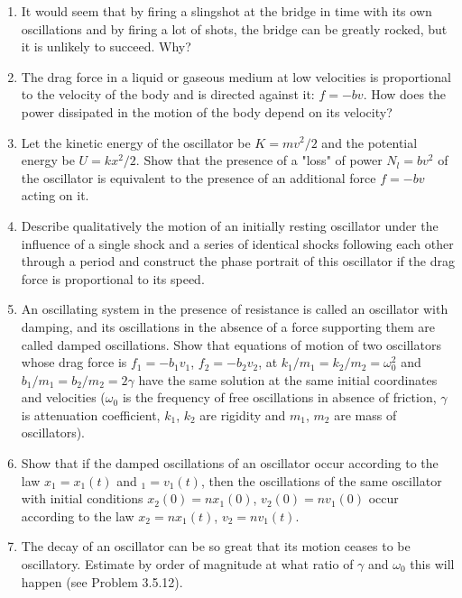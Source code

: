 \documentclass{article}
\begin{document}
\begin{enumerate}[label=3.5.\arabic*]
\item It would seem that by firing a slingshot at the bridge in time with its own oscillations and by firing a lot of shots, the bridge can be greatly rocked, but it is unlikely to succeed. Why?

\item The drag force in a liquid or gaseous medium at low velocities is proportional to the velocity of the body and is directed against it: $f = -b v$. How does the power dissipated in the motion of the body depend on its velocity?

\item Let the kinetic energy of the oscillator be $K = m v^2/2$ and the potential energy be $U = k x^2/2$. Show that the presence of a "loss" of power $N_l = b v^2$ of the oscillator is equivalent to the presence of an additional force $f = -b v$ acting on it.

\item Describe qualitatively the motion of an initially resting oscillator under the influence of a single shock and a series of identical shocks following each other through a period and construct the phase portrait of this oscillator if the drag force is proportional to its speed.

\item An oscillating system in the presence of resistance is called an oscillator with damping, and its oscillations in the absence of a force supporting them are called damped oscillations. Show that equations of motion of two oscillators whose drag force is $f_1 = -b_1 v_1$, $f_2 = - b_2 v_2$, at $k_1/m_1 = k_2/m_2 = \omega_0^2$ and $b_1/m_1 = b_2/m_2 = 2 \gamma$ have the same solution at the same initial coordinates and velocities ($\omega_0$ is the frequency of free oscillations in absence of friction, $\gamma$ is attenuation coefficient, $k_1$, $k_2$ are rigidity and $m_1$, $m_2$ are mass of oscillators).

\item Show that if the damped oscillations of an oscillator occur according to the law $x_1 = x_1 (t)$ and $_1 = v_1 (t)$, then the oscillations of the same oscillator with initial conditions $x_2(0) = n x_1(0)$, $v_2(0) = n v_1 (0)$ occur according to the law $x_2 = n x_1(t)$, $v_2 = n v_1 (t)$.

\item The decay of an oscillator can be so great that its motion ceases to be oscillatory. Estimate by order of magnitude at what ratio of $\gamma$ and $\omega_0$ this will happen (see Problem 3.5.12).


\end{enumerate}
\end{document}
